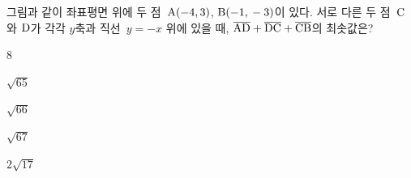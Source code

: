 \noindent\begin{minipage}[t]{0.58\linewidth}\vspace{0pt}\raggedright 그림과 같이 좌표평면 위에 두 점~$\mathrm{A}(-4{,}\mkern3mu 3)$, $\mathrm{B}(-1{,}\mkern3mu -3)$이 있다. 서로 다른 두 점~$\mathrm{C}$와 $\mathrm{D}$가 각각 $y$축과 직선~$y=-x$ 위에 있을 때, $\overline{\mathrm{AD}}+\overline{\mathrm{DC}}+\overline{\mathrm{CB}}$의 최솟값은?\end{minipage}\hfill\begin{minipage}[t]{0.4\linewidth}\vspace{0pt}\centering \resizebox{\ifdim\width>\linewidth\linewidth\else\width\fi}{!}{}\end{minipage}\par
\begin{choices32}{\rule[-3ex]{0pt}{8ex}$8$}{\rule[-3ex]{0pt}{8ex}$\sqrt{65}$}{\rule[-3ex]{0pt}{8ex}$\sqrt{66}$}{\rule[-3ex]{0pt}{8ex}$\sqrt{67}$}{\rule[-3ex]{0pt}{8ex}$2\sqrt{17}$}\end{choices32}
